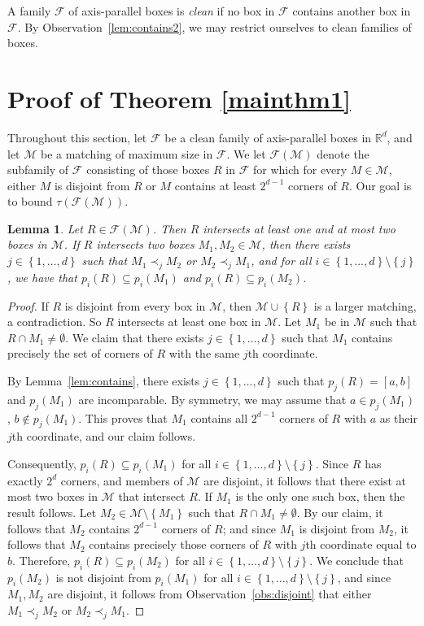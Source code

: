 \documentclass[12pt]{amsart}
\theoremstyle{plain}
\newtheorem{lemma}[theorem]{Lemma}
\theoremstyle{definition}
\theoremstyle{remark}
\newcommand{\F}{\mathcal{F}}
\newcommand{\M}{\mathcal{M}}
\newcommand{\R}{\mathbb{R}}
\newcommand{\sset}[1]{\left\{#1\right\}}
\begin{document}
A family $\F$ of axis-parallel boxes is \emph{clean} if no box in $\F$ contains another box in $\F$. By Observation~\ref{lem:contains2}, we may restrict ourselves to clean families of boxes. 

\section{Proof of Theorem \ref{mainthm1}}

Throughout this section, let $\F$ be a clean family of axis-parallel boxes in $\R^d$, and let $\M$ be a matching of maximum size in $\F$. We let $\F(\M)$ denote the subfamily of $\F$ consisting of those boxes $R$ in $\F$ for which for every $M \in \M$, either $M$ is disjoint from $R$ or $M$ contains at least $2^{d-1}$ corners of $R$. Our goal is to bound $\tau(\F(\M))$.

\begin{lemma} \label{lem:intersect} Let $R \in \F(\M)$. Then $R$ intersects at least one and at most two boxes in $\M$. If $R$ intersects two boxes $M_1, M_2 \in \M$, then there exists $j \in \sset{1,\dots, d}$ such that $M_1 \prec_j M_2$ or $M_2 \prec_j M_1$, and for all $i \in \sset{1, \dots, d} \setminus \sset{j}$, we have that $p_i(R) \subseteq p_i(M_1)$ and $p_i(R) \subseteq p_i(M_2)$.
\end{lemma}
\begin{proof}
If $R$ is disjoint from every box in $\M$, then $\M \cup \sset{R}$ is a larger matching, a contradiction. So $R$ intersects at least one box in $\M$. Let $M_1$ be in $\M$ such that $R \cap M_1 \neq \emptyset$. We claim that there exists $j \in \sset{1, \dots, d}$ such that $M_1$ contains precisely the set of corners of $R$ with the same $j$th coordinate. 

By Lemma~\ref{lem:contains}, there exists $j \in \sset{1,\dots,d}$ such that $p_j(R) = [a,b]$ and $p_j(M_1)$ are incomparable. By symmetry, we may assume that $a \in p_j(M_1)$, $b \not\in p_j(M_1)$. This proves that $M_1$ contains all $2^{d-1}$ corners of $R$ with $a$ as their $j$th coordinate, and our claim follows.

Consequently, $p_i(R) \subseteq p_i(M_1)$ for all $i \in \sset{1, \dots, d} \setminus \sset{j}$. Since $R$ has exactly $2^d$ corners, and members of $\M$ are disjoint, it follows that there exist at most two boxes in $\M$ that intersect $R$. If $M_1$ is the only one such box, then the result follows. Let $M_2 \in \M \setminus \sset{M_1}$ such that $R \cap M_1 \neq \emptyset$. By our claim, it follows that $M_2$ contains $2^{d-1}$ corners of $R$; and since $M_1$ is disjoint from $M_2$, it follows that $M_2$ contains precisely those corners of $R$ with $j$th coordinate equal to $b$. Therefore, $p_i(R) \subseteq p_i(M_2)$ for all $i \in \sset{1, \dots, d} \setminus \sset{j}$.  We conclude that $p_i(M_2)$ is not disjoint from $p_i(M_1)$ for all $i \in \sset{1, \dots, d} \setminus \sset{j}$, and  since $M_1, M_2$ are disjoint, it follows from Observation~\ref{obs:disjoint} that either $M_1 \prec_j M_2$ or $M_2 \prec_j M_1$. 
\end{proof}
\end{document}
